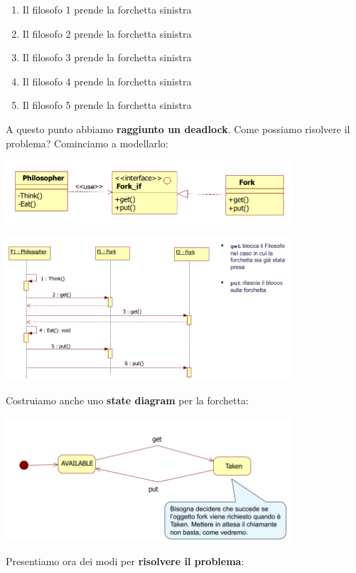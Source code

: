 \documentclass[12pt]{article}
\begin{document}
\begin{enumerate}
    \item Il filosofo 1 prende la forchetta sinistra
    \item Il filosofo 2 prende la forchetta sinistra
    \item Il filosofo 3 prende la forchetta sinistra
    \item Il filosofo 4 prende la forchetta sinistra
    \item Il filosofo 5 prende la forchetta sinistra
\end{enumerate}
A questo punto abbiamo \textbf{raggiunto un deadlock}. Come possiamo risolvere il problema? Cominciamo a modellarlo:
\begin{center}
    \includegraphics[width = 0.80\textwidth]{Images/106.PNG}
\end{center}
\begin{center}
    \includegraphics[width = 0.80\textwidth]{Images/107.PNG}
\end{center}
Costruiamo anche uno \textbf{state diagram} per la forchetta:
\begin{center}
    \includegraphics[width = 0.80\textwidth]{Images/108.PNG}
\end{center}
Presentiamo ora dei modi per \textbf{risolvere il problema}:
\end{document}
